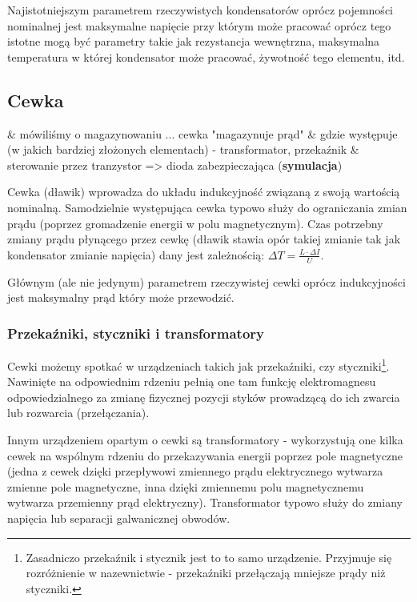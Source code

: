 Najistotniejszym parametrem rzeczywistych kondensatorów oprócz pojemności nominalnej jest maksymalne napięcie przy którym może pracować oprócz tego istotne mogą być parametry takie jak rezystancja wewnętrzna, maksymalna temperatura w której kondensator może pracować, żywotność tego elementu, itd.

\subsection{Cewka}
\begin{teacherOnly}
	\begin{easylist}[itemize]
		& mówiliśmy o magazynowaniu ... cewka "magazynuje prąd"
		& gdzie występuje (w jakich bardziej złożonych elementach) - transformator, przekaźnik
		& sterowanie przez tranzystor => dioda zabezpieczająca (\textbf{symulacja})
	\end{easylist}
\end{teacherOnly}

Cewka (dławik) wprowadza do układu indukcyjność związaną z swoją wartością nominalną. Samodzielnie występująca cewka typowo służy do ograniczania zmian prądu (poprzez gromadzenie energii w polu magnetycznym). Czas potrzebny zmiany prądu płynącego przez cewkę (dławik stawia opór takiej zmianie tak jak kondensator zmianie napięcia) dany jest zależnością: $\Delta T = \frac{L \cdot \Delta I}{U}$.

Głównym (ale nie jedynym) parametrem rzeczywistej cewki oprócz indukcyjności jest maksymalny prąd który może przewodzić.

\subsubsection{Przekaźniki, styczniki i transformatory}

Cewki możemy spotkać w urządzeniach takich jak przekaźniki, czy styczniki\footnote{Zasadniczo przekaźnik i stycznik jest to to samo urządzenie. Przyjmuje się rozróżnienie w nazewnictwie - przekaźniki przełączają mniejsze prądy niż styczniki.}.
Nawinięte na odpowiednim rdzeniu pełnią one tam funkcję elektromagnesu odpowiedzialnego za zmianę fizycznej pozycji styków prowadzącą do ich zwarcia lub rozwarcia (przełączania).

Innym urządzeniem opartym o cewki są transformatory - wykorzystują one kilka cewek na wspólnym rdzeniu do przekazywania energii poprzez pole magnetyczne (jedna z cewek dzięki przepływowi zmiennego prądu elektrycznego wytwarza zmienne pole magnetyczne, inna dzięki zmiennemu polu magnetycznemu wytwarza przemienny prąd elektryczny). Transformator typowo służy do zmiany napięcia lub separacji galwanicznej obwodów.

